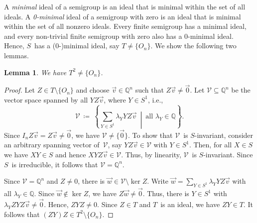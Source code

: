 \documentclass{lmcs}
\newtheorem{lemma}[thm]{Lemma}
\theoremstyle{definition}
\DeclareMathOperator{\im}{im}
\newcommand{\Q}{\mathbb{Q}}
\newcommand{\V}{\mathcal{V}}
\begin{document}
A \emph{minimal} ideal of a semigroup is an ideal that is minimal within the set of all ideals.
A \emph{0-minimal} ideal of a semigroup with zero is an ideal that is minimal within the set of all nonzero ideals.
Every finite semigroup has a minimal ideal, and 
every non-trivial finite semigroup with zero also has a 0-minimal ideal.
Hence, $S$~has a \mbox{(0-)}minimal ideal, say $T \ne \{O_n\}$.
We show the following two  lemmas.
\begin{lemma} \label{lem:T2}
We have $T^2 \ne \{O_n\}$.
\end{lemma}
\begin{proof}
%
%
Let $Z \in T \setminus \{O_n\}$ and choose $\vec{v} \in \Q^n$ such that $Z \vec{v} \ne \vec{0}$.
Let $\V \subseteq \Q^n$ be the vector space spanned by all $Y Z \vec{v}$, where $Y \in S^1$, i.e.,
\[
 \V \ \coloneqq \ \left\{\sum_{ Y \in S^1} \lambda_Y Y Z \vec{v} \ \middle\vert\ \text{all }\lambda_Y \in \Q \right\}.
\]
Since $I_n Z \vec{v} = Z \vec{v} \ne \vec{0}$, we have $\V \ne \{\vec{0}\}$.
To show that $\V$~is $S$-invariant, consider an arbitrary spanning vector of~$\V$, say $Y Z \vec{v} \in \V$ with $Y \in S^1$.
Then, for all $X \in S$ we have $X Y \in S$ and hence $X Y Z \vec{v} \in \V$.
Thus, by linearity, $\V$~is $S$-invariant.
Since $S$~is irreducible, it follows that $\V = \Q^n$.

Since $\V = \Q^n$ and $Z \ne 0$, there is $\vec{w} \in \V \setminus \ker Z$.
Write $\vec{w} = \sum_{Y \in S^1} \lambda_Y Y Z \vec{v}$ with all $\lambda_Y \in \Q$.
Since $\vec{w} \not\in \ker Z$, we have $Z \vec{w} \ne \vec{0}$.
Thus, there is $Y \in S^1$ with $\lambda_Y Z Y Z \vec{v} \ne \vec{0}$.
Hence, $Z Y Z \ne 0$.
Since $Z \in T$ and $T$~is an ideal, we have $Z Y \in T$.
It follows that $(Z Y) Z \in T^2 \setminus \{O_n\}$.
\end{proof}
\end{document}

